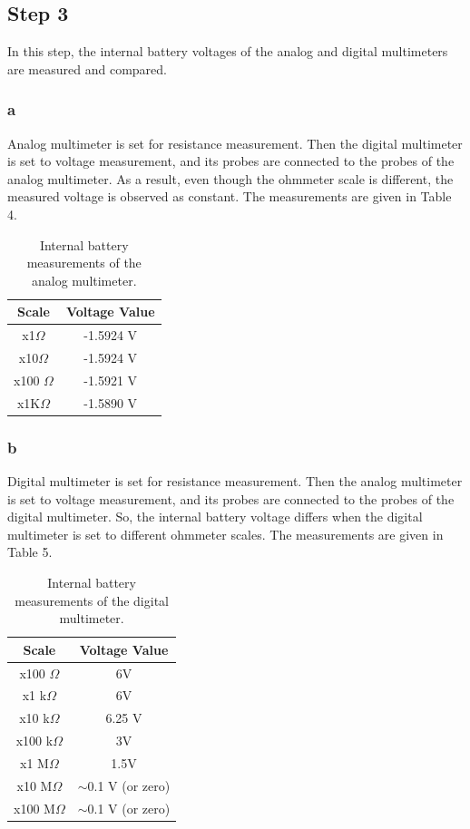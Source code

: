 \documentclass[letterpaper,12pt]{article}
\begin{document}
\subsection{Step 3}
In this step, the internal battery voltages of the analog and digital multimeters are measured and compared.
\subsubsection{a}
Analog multimeter is set for resistance measurement. Then the digital multimeter is set to voltage measurement, and its probes are connected to the probes of the analog multimeter. As a result, even though the ohmmeter scale is different, the measured voltage is observed as constant. The measurements are given in Table 4.
\begin{table}[H]
	\begin{center}
		
	
	\begin{tabular}{|| c | c ||}
	\hline
	Scale              & Voltage Value \\[0.5ex] 
	\hline\hline
	x1\( \Omega \)   & -1.5924 V     \\
	\hline
	x10\( \Omega \)  & -1.5924 V     \\
	\hline
	x100 \( \Omega \) & -1.5921 V     \\
	\hline
	x1K\( \Omega \)  & -1.5890 V   \\
	\hline
	\end{tabular}
	\caption{Internal battery measurements of the analog multimeter.}
\end{center}
\end{table}

\subsubsection{b}
Digital multimeter is set for resistance measurement. Then the analog multimeter is set to voltage measurement, and its probes are connected to the probes of the digital multimeter. So, the internal battery voltage differs when the digital multimeter is set to different ohmmeter scales. The measurements are given in Table 5.
\begin{table}[H]
	\centering
	\begin{tabular}{|| c | c ||}
		\hline
	Scale & Voltage Value \\\hline
	\hline
	x100 \( \Omega \) & 6V \\\hline
	x1 k\( \Omega \) & 6V \\\hline
	x10 k\( \Omega \) & 6.25 V \\\hline
	x100 k\( \Omega \) & 3V \\\hline
	x1 M\( \Omega \) & 1.5V \\\hline
	x10 M\( \Omega \) & $\sim$0.1 V (or zero) \\\hline
	x100 M\( \Omega \) & $\sim$0.1 V (or zero) \\\hline
	\end{tabular}
	\caption{Internal battery measurements of the digital multimeter.}
\end{table}
\end{document}

